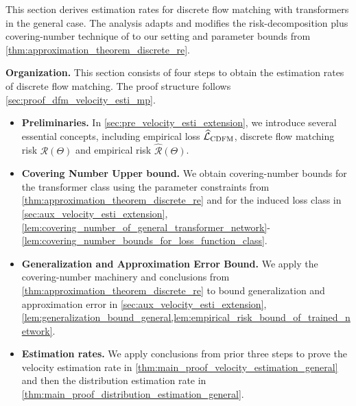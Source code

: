 \documentclass[12pt]{article}
\numberwithin{equation}{section}
\let\hat\widehat
\newcommand{\wh}{\widehat}
\renewcommand{\hat}{\wh}
\let\cite\citep
\theoremstyle{theoremstyle}
\numberwithin{equation}{section}
\numberwithin{theorem}{section}
\numberwithin{proposition}{section}
\numberwithin{definition}{section}
\numberwithin{lemma}{section}
\numberwithin{assumption}{section}
\numberwithin{remark}{section}
\begin{document}
This section derives estimation rates for discrete flow matching with transformers in the general case. 
The analysis adapts and modifies the risk-decomposition plus covering-number technique of \cite{fu2024unveil} to our setting and parameter bounds from \cref{thm:approximation_theorem_discrete_re}.

\textbf{Organization.} 
This section consists of four steps to obtain the estimation rates of discrete flow matching.
The proof structure follows \cref{sec:proof_dfm_velocity_esti_mp}.
\begin{itemize}
\item \textbf{Preliminaries.}
In \cref{sec:pre_velocity_esti_extension}, we introduce several essential concepts, including empirical loss $\hat{\mathcal{L}}_{\rm CDFM}$, discrete flow matching risk $\mathcal{R}(\Theta)$ and empirical risk $\hat{\mathcal{R}}(\Theta)$.

\item \textbf{Covering Number Upper bound.}
We obtain covering-number bounds for the transformer class using the parameter constraints from \cref{thm:approximation_theorem_discrete_re} and for the induced loss class in \cref{sec:aux_velocity_esti_extension}, \cref{lem:covering_number_of_general_transformer_network}-\cref{lem:covering_number_bounds_for_loss_function_class}.

\item \textbf{Generalization and Approximation Error Bound.}
We apply the covering-number machinery and conclusions from \cref{thm:approximation_theorem_discrete_re} to bound generalization and approximation error in \cref{sec:aux_velocity_esti_extension}, \cref{lem:generalization_bound_general,lem:empirical_risk_bound_of_trained_network}.

\item  \textbf{Estimation rates.}
We apply conclusions from prior three steps to prove the velocity estimation rate in \cref{thm:main_proof_velocity_estimation_general} and then the distribution estimation rate in \cref{thm:main_proof_distribution_estimation_general}.
\end{itemize}
\end{document}
